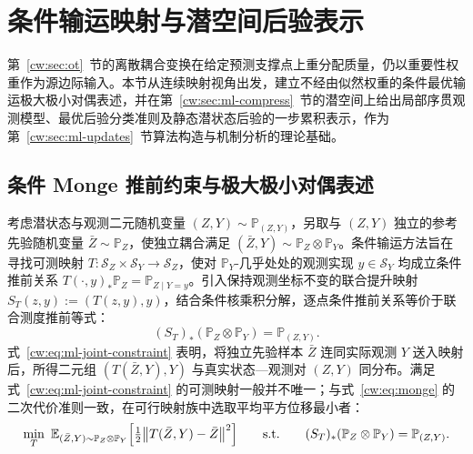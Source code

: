 \section{条件输运映射与潜空间后验表示}\label{cw:sec:ml-transport-theory}

第~\ref{cw:sec:ot}~节的离散耦合变换在给定预测支撑点上重分配质量，仍以重要性权重作为源边际输入。本节从连续映射视角出发，建立不经由似然权重的条件最优输运极大极小对偶表述，并在第~\ref{cw:sec:ml-compress}~节的潜空间上给出局部序贯观测模型、最优后验分类准则及静态潜状态后验的一步累积表示，作为第~\ref{cw:sec:ml-updates}~节算法构造与机制分析的理论基础。

\subsection{条件 Monge 推前约束与极大极小对偶表述}\label{cw:sec:ml-minimax}

考虑潜状态与观测二元随机变量 $(Z,Y)\sim\mathbb P_{(Z,Y)}$，另取与 $(Z,Y)$ 独立的参考先验随机变量 $\bar Z\sim\mathbb P_Z$，使独立耦合满足 $(\bar Z,Y)\sim\mathbb P_Z\otimes\mathbb P_Y$。条件输运方法旨在寻找可测映射 $T:\mathcal S_Z\times\mathcal S_Y\to\mathcal S_Z$，使对 $\mathbb P_Y$-几乎处处的观测实现 $y\in\mathcal S_Y$ 均成立条件推前关系 $T(\cdot,y)_*\mathbb P_Z=\mathbb P_{Z\mid Y=y}$\cite{aljarrah2023otpf,aljarrah2024brenier}。引入保持观测坐标不变的联合提升映射 $S_T(z,y):=(T(z,y),y)$，结合条件核乘积分解，逐点条件推前关系等价于联合测度推前等式：
\begin{equation}\label{cw:eq:ml-joint-constraint}
(S_T)_*(\mathbb P_Z\otimes\mathbb P_Y)=\mathbb P_{(Z,Y)}.
\end{equation}
式~\eqref{cw:eq:ml-joint-constraint} 表明，将独立先验样本 $\bar Z$ 连同实际观测 $Y$ 送入映射后，所得二元组 $(T(\bar Z,Y),Y)$ 与真实状态—观测对 $(Z,Y)$ 同分布。满足式~\eqref{cw:eq:ml-joint-constraint} 的可测映射一般并不唯一；与式~\eqref{cw:eq:monge} 的二次代价准则一致，在可行映射族中选取平均平方位移最小者：
\begin{equation}\label{cw:eq:ml-constrained}
\min_{T}\ \mathbb E_{(\bar Z,Y)\sim\mathbb P_Z\otimes\mathbb P_Y}\Bigl[\tfrac12\bigl\|T(\bar Z,Y)-\bar Z\bigr\|^2\Bigr]
\qquad\text{s.t.}\qquad (S_T)_*(\mathbb P_Z\otimes\mathbb P_Y)=\mathbb P_{(Z,Y)}.
\end{equation}

